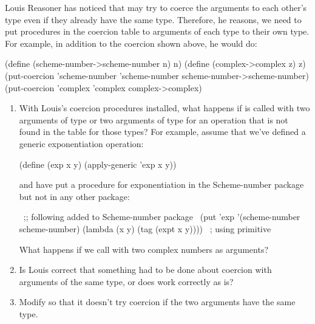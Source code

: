\begin{exercise}
	\label{Exercise 2.81}
	Louis Reasoner has noticed that  may try to coerce the arguments to each other’s type even if they already have the same type.
	Therefore, he reasons, we need to put procedures in the coercion table to  arguments of each type to their own type.
	For example, in addition to the  coercion shown above, he would do:
	\begin{scheme}
	  (define (scheme-number->scheme-number n) n)
	  (define (complex->complex z) z)
	  (put-coercion 'scheme-number
	                'scheme-number
	                scheme-number->scheme-number)
	  (put-coercion 'complex 'complex complex->complex)
	\end{scheme}
	\begin{enumerate}[label = \alph*., leftmargin = *]

		\item
			With Louis’s coercion procedures installed, what happens if  is called with two arguments of type  or two arguments of type  for an operation that is not found in the table for those types?
			For example, assume that we’ve defined a generic exponentiation operation:
			\begin{scheme}
			  (define (exp x y) (apply-generic 'exp x y))
			\end{scheme}
			and have put a procedure for exponentiation in the Scheme-number package but not in any other package:
		\begin{scheme}
		  ~\textrm{;; following added to Scheme-number package}~
		  (put 'exp '(scheme-number scheme-number)
		       (lambda (x y) (tag (expt x y))))
		       ~\textrm{; using primitive }~
		\end{scheme}
		What happens if we call  with two complex numbers as arguments?

		\item
			Is Louis correct that something had to be done about coercion with arguments of the same type, or does  work correctly as is?

		\item
			Modify  so that it doesn’t try coercion if the two arguments have the same type.

	\end{enumerate}
\end{exercise}




